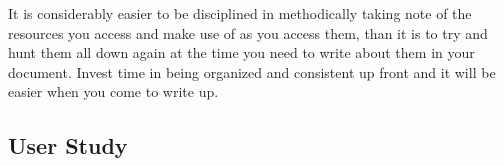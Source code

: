 		It is considerably easier to be disciplined in methodically taking note of the resources you access and make use of as you access them, than it is to try and hunt them all down again at the time you need to write about them in your document. Invest time in being organized and consistent up front and it will be easier when you come to write up.
		
	\subsection{User Study}